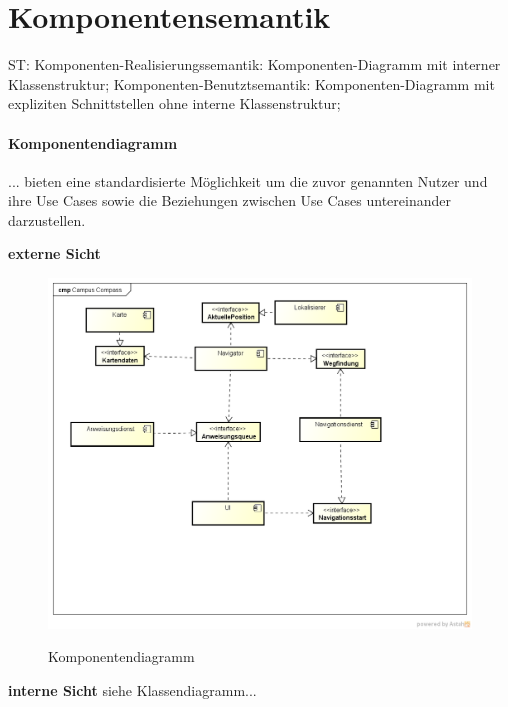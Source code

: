 \chapter{Komponentensemantik}
ST: Komponenten-Realisierungssemantik: Komponenten-Diagramm mit
interner Klassenstruktur;
Komponenten-Benutztsemantik: Komponenten-Diagramm mit expliziten
Schnittstellen ohne interne Klassenstruktur;

\subsubsection*{Komponentendiagramm}
... bieten eine standardisierte Möglichkeit um die zuvor genannten Nutzer und ihre Use Cases sowie die Beziehungen zwischen Use Cases untereinander darzustellen.

\textbf{externe Sicht}
\begin{figure}[hbt]
  \centering
  \includegraphics[width=\linewidth]{img/komponentendiagramm.png}
  \label{img:komponentendiagramm}
  \caption{Komponentendiagramm}
\end{figure}

\textbf{interne Sicht}
siehe Klassendiagramm...